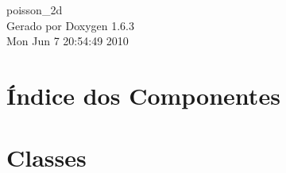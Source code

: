\documentclass[a4paper]{book}
\begin{document}
\hypersetup{pageanchor=false}
\begin{titlepage}
\vspace*{7cm}
\begin{center}
{\Large poisson\_\-2d }\\
\vspace*{1cm}
{\large Gerado por Doxygen 1.6.3}\\
\vspace*{0.5cm}
{\small Mon Jun 7 20:54:49 2010}\\
\end{center}
\end{titlepage}
\clearemptydoublepage
{}
\tableofcontents
\clearemptydoublepage
{}
\hypersetup{pageanchor=true}
\chapter{Índice dos Componentes}

\chapter{Classes}












\printindex
\end{document}
